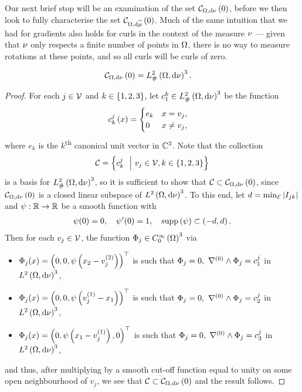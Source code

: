 Our next brief stop will be an examination of the set $\mathcal{C}_{ \Omega, \mathrm{d}\nu}\left( 0 \right)$, before we then look to fully characterise the set $\mathcal{C}_{ \Omega, \mathrm{d}\widetilde{\mu}}\left( 0 \right)$.
Much of the same intuition that we had for gradients also holds for curls in the context of the measure $\nu$ --- given that $\nu$ only respects a finite number of points in $\Omega$, there is no way to measure rotations at these points, and so all curls will be curls of zero.
\begin{prop} \label{prop:VertexCurlZero}
	\begin{align*}
		\mathcal{C}_{ \Omega, \mathrm{d}\nu}\left( 0 \right) &= L^2_{\#}\left( \Omega,\mathrm{d} \nu \right)^3.
	\end{align*}
\end{prop}
\begin{proof}
	For each $j\in\mathcal{V}$ and $k\in\left\{ 1,2,3 \right\}$, let $c^k_1\in L^2_{\#}\left( \Omega,\mathrm{d} \nu \right)^3$ be the function
	\begin{align*}
		c^j_k\left( x \right) &= \begin{cases} e_k & x=v_j, \\ 0 & x\neq v_j, \end{cases}
	\end{align*}
	where $e_k$ is the $k$\textsuperscript{th} canonical unit vector in $\mathbb{C}^3$.
	Note that the collection 
	\begin{align*}
		\mathcal{C} = \left\{ c^j_k \ \ \middle\vert \  v_j\in\mathcal{V}, k\in\left\{ 1,2,3 \right\} \right\}
	\end{align*}
	is a basis for $L^2_{\#}\left( \Omega,\mathrm{d} \nu \right)^3$, so it is sufficient to show that $\mathcal{C}\subset\mathcal{C}_{ \Omega, \mathrm{d}\nu}\left( 0 \right)$, since $\mathcal{C}_{ \Omega, \mathrm{d}\nu}\left( 0 \right)$ is a closed linear subspace of $L^{2}\left( \Omega,\mathrm{d} \nu \right)^3$.
	To this end, let $d=\min_{\mathcal{E}}\left\lvert I_{jk} \right\rvert$ and $\psi:\mathbb{R}\rightarrow\mathbb{R}$ be a smooth function with 
	\begin{align*}
		\psi(0) = 0, \quad \psi'(0) = 1, \quad \mathrm{supp}\left( \psi \right) \subset \left( -d,d \right).
	\end{align*}
	Then for each $v_j\in\mathcal{V}$, the function $\Phi_j\in C^{\infty}_{0}\left( \Omega \right)^3$ via 
	\begin{itemize}
		\item $\Phi_j(x) = \left( 0, 0, \psi\left( x_2 - v_j^{(2)} \right) \right)^\top$ is such that $\Phi_j = 0, \ \nabla^{(0)}\wedge\Phi_j = c^j_1$ in $L^{2}\left( \Omega,\mathrm{d} \nu \right)^3$,
		\item $\Phi_j(x) = \left( 0, 0, \psi\left( v_j^{(1)} - x_1 \right) \right)^\top$ is such that $\Phi_j = 0, \ \nabla^{(0)}\wedge\Phi_j = c^j_2$ in $L^{2}\left( \Omega,\mathrm{d} \nu \right)^3$,
		\item $\Phi_j(x) = \left( 0, \psi\left( x_1 - v_j^{(1)} \right), 0 \right)^\top$ is such that $\Phi_j = 0, \ \nabla^{(0)}\wedge\Phi_j = c^j_3$ in $L^{2}\left( \Omega,\mathrm{d} \nu \right)^3$,
	\end{itemize}
	and thus, after multiplying by a smooth cut-off function equal to unity on some open neighbourhood of $v_j$, we see that $\mathcal{C}\subset\mathcal{C}_{ \Omega, \mathrm{d}\nu}\left( 0 \right)$ and the result follows.
\end{proof}

